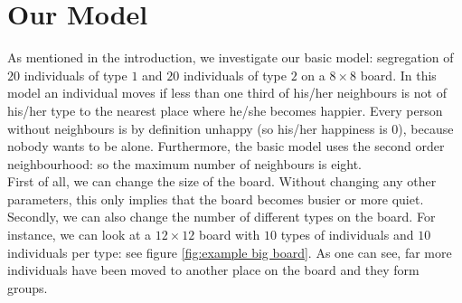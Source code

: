 \section{Our Model}
As mentioned in the introduction, we investigate our basic model: segregation of $20$ individuals of type $1$ and $20$ individuals of type $2$ on a $8 \times 8$ board.
In this model an individual moves if less than one third of his/her neighbours is not of his/her type to the nearest place where he/she becomes happier.
Every person without neighbours is by definition unhappy (so his/her happiness is $0$), because nobody wants to be alone.
Furthermore, the basic model uses the second order neighbourhood: so the maximum number of neighbours is eight.\\

First of all, we can change the size of the board.
Without changing any other parameters, this only implies that the board becomes busier or more quiet.
Secondly, we can also change the number of different types on the board.
For instance, we can look at a $12\times 12$ board with $10$ types of individuals and $10$ individuals per type: see figure \ref{fig:example big board}.
As one can see, far more individuals have been moved to another place on the board and they form groups.

